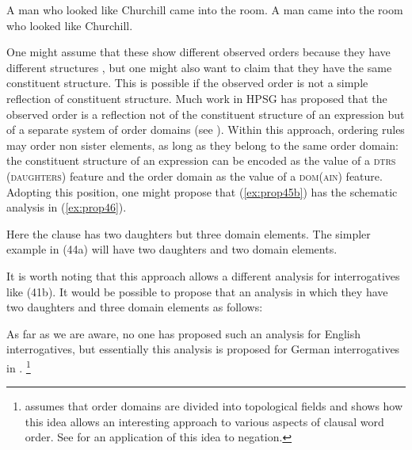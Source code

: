 \documentclass[output=paper
	        ,collection
	        ,collectionchapter
 	        ,biblatex
                ,babelshorthands
                ,newtxmath
                ,draftmode
                ,colorlinks, citecolor=brown
]{langscibook}
\begin{document}
\ea\label{ex:prop45}
	\ea\label{ex:prop45a}
	A man who looked like Churchill came into the room.
	\ex\label{ex:prop45b}
	A man came into the room who looked like Churchill.
	\z
\z

One might assume that these show different observed orders because they have different structures \citep{Kiss2005a}, but one might also want to claim that they have the same constituent structure. This is possible if the observed order is not a simple reflection of constituent structure. Much work in HPSG has proposed that the observed order is a reflection not of the constituent structure of an expression but of a separate system of order domains (see \citealp{Reape94a,Babel,Kathol2000a}). Within this approach, ordering rules may order non sister elements, as long as they belong to the same order domain: the constituent structure of an expression can be encoded as the value of a \textsc{dtrs (daughters)} feature and the order domain as the value of a \textsc{dom(ain)} feature. Adopting this position, one might propose that (\ref{ex:prop45b}) has the schematic analysis in (\ref{ex:prop46}).

\ea\label{ex:prop46}
\z

Here the clause has two daughters but three domain elements. The simpler example in (44a) will have two daughters and two domain elements.

It is worth noting that this approach allows a different analysis for interrogatives like (41b). It would be possible to propose that an analysis in which they have two daughters and three domain elements as follows:

\ea\label{ex:prop47}
\z

As far as we are aware, no one has proposed such an analysis for English interrogatives, but essentially this analysis is proposed for German interrogatives in \citet[81]{Kathol2000a}.%
%
\footnote{\citet{Kathol2000a} assumes that order domains are divided into topological fields and shows how this idea allows an interesting approach to various aspects of clausal word order. See \citet{Borsley:06} for an application of this idea to negation.}
%
\end{document}
